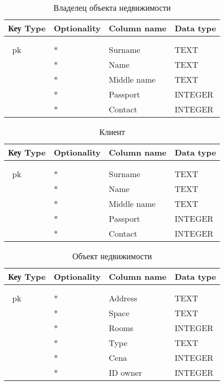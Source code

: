 \begin{xltabular}{\textwidth}{|l|l|X|X|}
	\caption{Владелец объекта недвижимости\label{owner:table}}\\ \hline
	\centrow Кеу Type & \centrow Optionality & \centrow Column name & \centrow Data type \\ \hline
	 &  &  &  \\ \hline
	\endfirsthead
	 &  &  &  \\ \hline
	\finishhead
	\ pk & * & Surname & TEXT \\ \hline
	& * & Name & TEXT \\ \hline
	& * & Middle name & TEXT \\ \hline
	& * & Passport & INTEGER \\ \hline
	& * & Contact & INTEGER \\ \hline
\end{xltabular}



\begin{xltabular}{\textwidth}{|l|l|X|X|}
	\caption{Клиент\label{client:table}}\\ \hline
	\centrow Кеу Type & \centrow Optionality & \centrow Column name & \centrow Data type \\ \hline
	 &  &  &  \\ \hline
	\endfirsthead
	 &  &  &  \\ \hline
	\finishhead
	\ pk & * & Surname & TEXT \\ \hline
	& * & Name & TEXT \\ \hline
	& * & Middle name & TEXT \\ \hline
	& * & Passport & INTEGER \\ \hline
	& * & Contact & INTEGER \\ \hline
\end{xltabular}



\begin{xltabular}{\textwidth}{|l|l|X|X|}
	\caption{Объект недвижимости\label{realty:table}}\\ \hline
	\centrow Кеу Type & \centrow Optionality & \centrow Column name & \centrow Data type \\ \hline
	 &  &  &  \\ \hline
	\endfirsthead
	 &  &  &  \\ \hline
	\finishhead
	\ pk & * & Address & TEXT \\ \hline
	& * & Space & TEXT \\ \hline
	& * & Rooms & INTEGER \\ \hline
	& * & Type & TEXT \\ \hline
	& * & Cena & INTEGER \\ \hline
	& * & ID owner & INTEGER \\ \hline
\end{xltabular}

